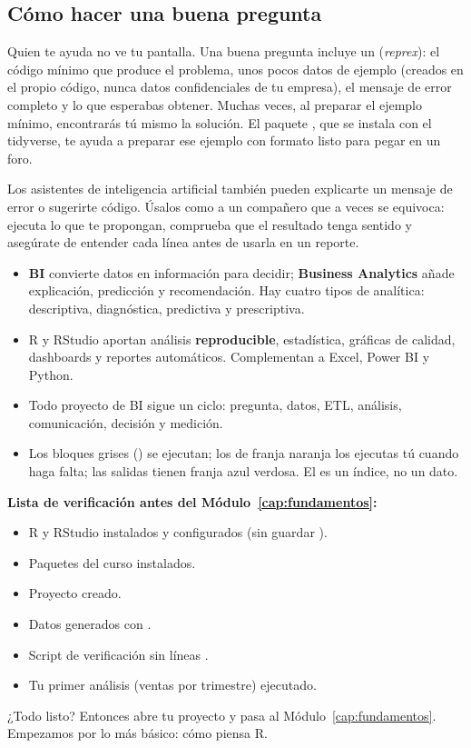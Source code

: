 \subsection{Cómo hacer una buena pregunta}

Quien te ayuda no ve tu pantalla. Una buena pregunta incluye un
 (\textit{reprex}): el código mínimo que
produce el problema, unos pocos datos de ejemplo (creados en el propio
código, nunca datos confidenciales de tu empresa), el mensaje de error
completo y lo que esperabas obtener. Muchas veces, al preparar el ejemplo
mínimo, encontrarás tú mismo la solución. El paquete , que
se instala con el tidyverse, te ayuda a preparar ese ejemplo con formato
listo para pegar en un foro.

Los asistentes de inteligencia artificial también pueden explicarte un
mensaje de error o sugerirte código. Úsalos como a un compañero que a veces
se equivoca: ejecuta lo que te propongan, comprueba que el resultado tenga
sentido y asegúrate de entender cada línea antes de usarla en un reporte.

\begin{resumen}[title={Resumen de la introducción}]
\begin{itemize}
  \item \textbf{BI} convierte datos en información para decidir;
        \textbf{Business Analytics} añade explicación, predicción y
        recomendación. Hay cuatro tipos de analítica: descriptiva,
        diagnóstica, predictiva y prescriptiva.
  \item R y RStudio aportan análisis \textbf{reproducible},
        estadística, gráficas de calidad, dashboards y reportes
        automáticos. Complementan a Excel, Power BI y Python.
  \item Todo proyecto de BI sigue un ciclo: pregunta, datos, ETL, análisis,
        comunicación, decisión y medición.
  \item Los bloques grises () se ejecutan; los de franja
        naranja los ejecutas tú cuando haga falta; las salidas tienen
        franja azul verdosa. El \codigo{[1]} es un índice, no un dato.
  \end{itemize}
\textbf{Lista de verificación antes del Módulo~\ref{cap:fundamentos}:}
\begin{itemize}
  \item[\ding{113}] R y RStudio instalados y configurados (sin guardar
        ).
  \item[\ding{113}] Paquetes del curso instalados.
  \item[\ding{113}] Proyecto  creado.
  \item[\ding{113}] Datos generados con .
  \item[\ding{113}] Script de verificación sin líneas .
  \item[\ding{113}] Tu primer análisis (ventas por trimestre) ejecutado.
\end{itemize}
\end{resumen}

¿Todo listo? Entonces abre tu proyecto y pasa al
Módulo~\ref{cap:fundamentos}. Empezamos por lo más básico: cómo piensa R.

\endgroup
